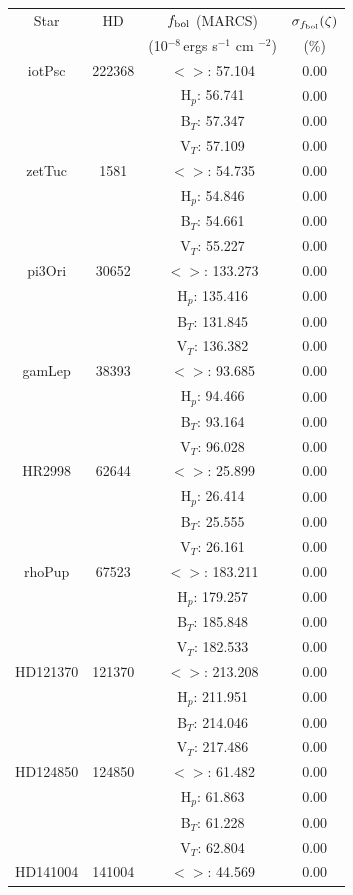 \begin{tabular}{cccc}
\hline
Star & HD & $f_{\rm bol}$ (MARCS) & $\sigma_{f_{\rm bol}} (\zeta)$ \\
 &  & (10$^{-8}\,$ergs s$^{-1}$ cm $^{-2}$) & (\%) \\
\hline
iotPsc & 222368 & $<>$: 57.104 & 0.00 \\
 & & H$_p$: 56.741 &0.00 \\
 & & B$_T$: 57.347 &0.00 \\
 & & V$_T$: 57.109 &0.00 \\
zetTuc & 1581 & $<>$: 54.735 & 0.00 \\
 & & H$_p$: 54.846 &0.00 \\
 & & B$_T$: 54.661 &0.00 \\
 & & V$_T$: 55.227 &0.00 \\
pi3Ori & 30652 & $<>$: 133.273 & 0.00 \\
 & & H$_p$: 135.416 &0.00 \\
 & & B$_T$: 131.845 &0.00 \\
 & & V$_T$: 136.382 &0.00 \\
gamLep & 38393 & $<>$: 93.685 & 0.00 \\
 & & H$_p$: 94.466 &0.00 \\
 & & B$_T$: 93.164 &0.00 \\
 & & V$_T$: 96.028 &0.00 \\
HR2998 & 62644 & $<>$: 25.899 & 0.00 \\
 & & H$_p$: 26.414 &0.00 \\
 & & B$_T$: 25.555 &0.00 \\
 & & V$_T$: 26.161 &0.00 \\
rhoPup & 67523 & $<>$: 183.211 & 0.00 \\
 & & H$_p$: 179.257 &0.00 \\
 & & B$_T$: 185.848 &0.00 \\
 & & V$_T$: 182.533 &0.00 \\
HD121370 & 121370 & $<>$: 213.208 & 0.00 \\
 & & H$_p$: 211.951 &0.00 \\
 & & B$_T$: 214.046 &0.00 \\
 & & V$_T$: 217.486 &0.00 \\
HD124850 & 124850 & $<>$: 61.482 & 0.00 \\
 & & H$_p$: 61.863 &0.00 \\
 & & B$_T$: 61.228 &0.00 \\
 & & V$_T$: 62.804 &0.00 \\
HD141004 & 141004 & $<>$: 44.569 & 0.00 \\

\end{tabular}
